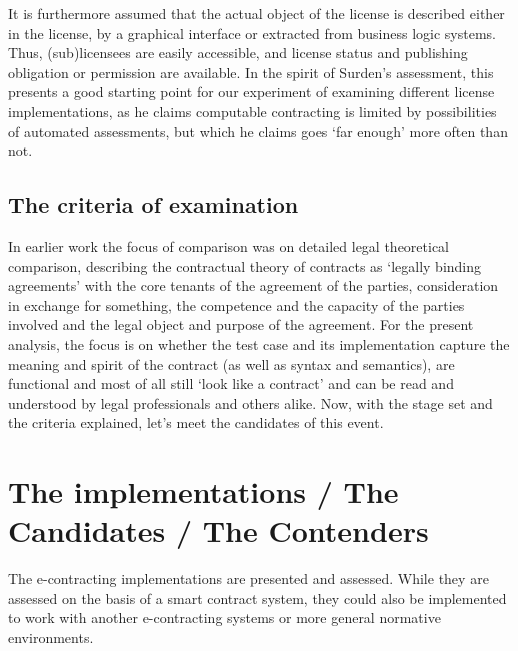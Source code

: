 \documentclass[conference]{IEEEtran}
\begin{document}
It is furthermore assumed that the actual object of the license is described either in the license, by a graphical interface or extracted from business logic systems. Thus, (sub)licensees are easily accessible, and license status and publishing obligation or permission are available.
In the spirit of Surden’s assessment, this presents a good starting point for our experiment of examining different license implementations, as he claims computable contracting is limited by possibilities of automated assessments, but which he claims goes ‘far enough’ more often than not.

\subsection{The criteria of examination}
In earlier work the focus of comparison was on detailed legal theoretical comparison, describing the contractual theory of contracts as ‘legally binding agreements’  with the core tenants of the agreement of the parties, consideration in exchange for something, the competence and the capacity of the parties involved and the legal object and purpose of the agreement. \cite{governatoriLegalContractsImperative2018} %
 For the present analysis, the focus is on whether the test case and its implementation capture the meaning and spirit of the contract (as well as syntax and semantics), are functional and most of all still ‘look like a contract’ and can be read and understood by legal professionals and others alike. 
Now, with the stage set and the criteria explained, let’s meet the candidates of this event.
\section{The implementations / The Candidates / The Contenders}
The e-contracting implementations are presented and assessed. While they are assessed on the basis of a smart contract system, they could %
also be implemented to work with another e-contracting systems or more general normative environments. 
\end{document}
